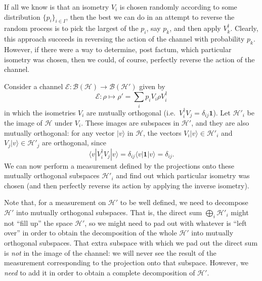 \documentclass[fleqn,a4paper]{article}
\theoremstyle{definition}
\theoremstyle{definition}
\theoremstyle{definition}
\theoremstyle{definition}
\theoremstyle{remark}
\begin{document}
If all we know is that an isometry \(V_i\) is chosen randomly according to some distribution \(\{p_i\}_{i\in I}\), then the best we can do in an attempt to reverse the random process is to pick the largest of the \(p_i\), say \(p_k\), and then apply \(V_k^\dagger\).
Clearly, this approach succeeds in reversing the action of the channel with probability \(p_k\).
However, if there were a way to determine, post factum, which particular isometry was chosen, then we could, of course, perfectly reverse the action of the channel.

Consider a channel \(\mathcal{E}\colon\mathcal{B}(\mathcal{H})\to\mathcal{B}(\mathcal{H}')\) given by
\[
  \mathcal{E}\colon\rho
  \longmapsto \rho'
  = \sum_i p_i V_i\rho V^\dagger_i
\]
in which the isometries \(V_i\) are mutually orthogonal (i.e.~\(V_i^\dagger V_j =\delta_{ij}\mathbf{1}\)).
Let \(\mathcal{H}'_i\) be the image of \(\mathcal{H}\) under \(V_i\).
These images are subspaces in \(\mathcal{H}'\), and they are also mutually orthogonal: for any vector \(|v\rangle\) in \(\mathcal{H}\), the vectors \(V_i|v\rangle\in \mathcal{H}'_i\) and \(V_j|v\rangle\in \mathcal{H}'_j\) are orthogonal, since
\[
  \langle v|V_i^\dagger V_j|v\rangle
  = \delta_{ij} \langle v|\mathbf{1}|v\rangle
  = \delta_{ij}.
\]
We can now perform a measurement defined by the projections onto these mutually orthogonal subspaces \(\mathcal{H}'_i\) and find out which particular isometry was chosen (and then perfectly reverse its action by applying the inverse isometry).

Note that, for a measurement on \(\mathcal{H}'\) to be well defined, we need to decompose \(\mathcal{H}'\) into mutually orthogonal subspaces.
That is, the direct sum \(\bigoplus_i\mathcal{H}'_i\) might not ``fill up'' the space \(\mathcal{H}'\), so we might need to pad out with whatever is ``left over'' in order to obtain the decomposition of the whole \(\mathcal{H}'\) into mutually orthogonal subspaces.
That extra subspace with which we pad out the direct sum is \emph{not} in the image of the channel: we will never see the result of the measurement corresponding to the projection onto that subspace.
However, we \emph{need} to add it in order to obtain a complete decomposition of \(\mathcal{H}'\).
\end{document}
